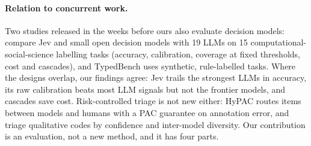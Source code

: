 \paragraph{Relation to concurrent work.} Two studies released in the weeks before ours also evaluate decision models:
\citet{ibrahim2026decision} compare Jev and small open decision models with 19 LLMs on 15 computational-social-science
labelling tasks (accuracy, calibration, coverage at fixed thresholds, cost and cascades), and TypedBench
\citep{sharma2026typedbench} uses synthetic, rule-labelled tasks. Where the designs overlap, our findings agree: Jev trails
the strongest LLMs in accuracy, its raw calibration beats most LLM signals but not the frontier models, and cascades save
cost. Risk-controlled triage is not new either: HyPAC \citep{zeng2026hypac} routes items between models and humans with a
PAC guarantee on annotation error, and \citet{zhao2025confidence} triage qualitative codes by confidence and inter-model
diversity. Our contribution is an evaluation, not a new method, and it has four parts.

